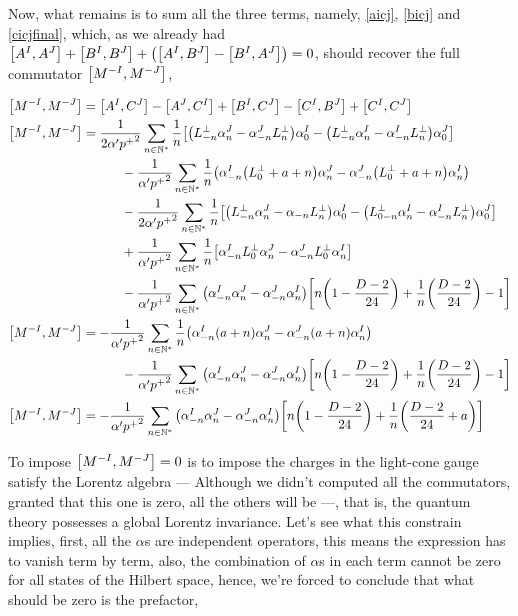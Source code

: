 Now, what remains is to sum all the three terms, namely, \ref{aicj}, \ref{bicj} and \ref{cicjfinal}, which, as we already had $\comm{A^I}{A^J}+\comm{B^I}{B^J}+\qty(\comm{A^I}{B^J}-\comm{B^I}{A^J})=0$, should 
recover the full commutator $\comm{M^{-I}}{M^{-J}}$,

\begin{align*}
    \comm{M^{-I}}{M^{-J}}&=\comm{A^I}{C^J}-\comm{A^J}{C^I}+\comm{B^I}{C^J}-\comm{C^I}{B^J}+\comm{C^I}{C^J}\\
    \comm{M^{-I}}{M^{-J}}&=\frac{1}{2\alpha'{p^+}^2}\sum\limits_{n\in\mathbb N^\ast}\frac1n\qty[\qty(L^\perp_{-n}\alpha_n^J-\alpha_{-n}^JL^\perp_{n})\alpha^I_0-\qty(L^\perp_{-n}\alpha_n^I-\alpha_{-n}^IL^\perp_{n})\alpha^J_0]\\
    &\quad\quad\quad-\frac{1}{\alpha'{p^+}^2}\sum\limits_{n\in\mathbb N^\ast}\frac1n\qty(\alpha_{-n}^I\qty(L_0^\perp +a+n)\alpha_n^J-\alpha_{-n}^J\qty(L^\perp_0+a+n)\alpha_n^I)\\
    &\quad\quad\quad-\frac{1}{2\alpha'{p^+}^2}\sum\limits_{n\in\mathbb N^\ast}\frac{1}{n}\qty[\qty(L^\perp_{-n}\alpha^J_n-\alpha_{-n}L^\perp_n)\alpha_0^I-\qty(L^\perp_{0-n}\alpha^I_n-\alpha^I_{-n}L^\perp_n)\alpha^J_{0}]\\
    &\quad\quad\quad+\frac{1}{ \alpha'{p^+}^2}\sum\limits_{n\in\mathbb N^\ast}\frac1n\qty[\alpha^I_{-n}L^\perp_{0}\alpha_n^J-\alpha^J_{-n}L^\perp_{0}\alpha_n^I]\\
    &\quad\quad\quad-\frac{1}{\alpha'{p^+}^2}\sum\limits_{n\in\mathbb N^\ast}\qty(\alpha^I_{-n}\alpha^J_n-\alpha^J_{-n}\alpha^I_n)\qty[n\qty(1-\frac{D-2}{24})+\frac1n\qty(\frac{D-2}{24})-1]\\
    \comm{M^{-I}}{M^{-J}}&=-\frac{1}{\alpha'{p^+}^2}\sum\limits_{n\in\mathbb N^\ast}\frac1n\qty(\alpha_{-n}^I\qty(a+n)\alpha_n^J-\alpha_{-n}^J\qty(a+n)\alpha_n^I)\\
    &\quad\quad\quad-\frac{1}{\alpha'{p^+}^2}\sum\limits_{n\in\mathbb N^\ast}\qty(\alpha^I_{-n}\alpha^J_n-\alpha^J_{-n}\alpha^I_n)\qty[n\qty(1-\frac{D-2}{24})+\frac1n\qty(\frac{D-2}{24})-1]\\
    \comm{M^{-I}}{M^{-J}}&=-\frac{1}{\alpha'{p^+}^2}\sum\limits_{n\in\mathbb N^\ast}\qty(\alpha^I_{-n}\alpha^J_n-\alpha^J_{-n}\alpha^I_n)\qty[n\qty(1-\frac{D-2}{24})+\frac1n\qty(\frac{D-2}{24}+a)]
\end{align*}

To impose $\comm{M^{-I}}{M^{-J}}=0$ is to impose the charges in the light-cone gauge satisfy the Lorentz algebra --- Although we didn't computed all the commutators, granted that this one is zero, all the others will be ---, that is,
the quantum theory possesses a global Lorentz invariance. Let's see what this constrain implies, first, all the $\alpha$s are independent operators, this means the expression has to vanish 
term by term, also, the combination of $\alpha$s in each term cannot be zero for all states of the Hilbert space, hence, we're forced to conclude that what should be zero is the prefactor,

